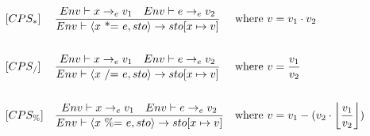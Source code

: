 \begin{align*}
%
&[CPS_*] & &\frac{Env \vdash x \rightarrow_e v_1 \quad Env \vdash e \rightarrow_e v_2}{Env \vdash \langle x \text{ *= } e, sto \rangle \rightarrow sto[x \mapsto v]} & &\text{where } v = v_1 \cdot v_2\\\\
%
&[CPS_/] & &\frac{Env \vdash x \rightarrow_e v_1 \quad Env \vdash e \rightarrow_e v_2}{Env \vdash \langle x \text{ /= } e, sto \rangle \rightarrow sto[x \mapsto v]} & &\text{where } v = \frac{v_1}{v_2}\\\\
%
&[CPS_\%] & &\frac{Env \vdash x \rightarrow_e v_1 \quad Env \vdash e \rightarrow_e v_2}{Env \vdash \langle x \text{ \%= } e, sto \rangle \rightarrow sto[x \mapsto v]} & &\text{where } v = v_1 - (v_2 \cdot \floor*{\frac{v_1}{v_2}})
\end{align*}